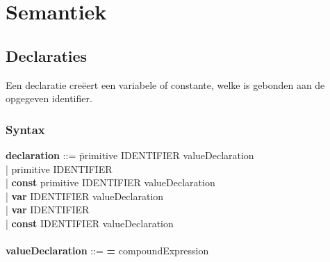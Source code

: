 \chapter{Semantiek}
\section{Declaraties}
Een declaratie cre\"{e}ert een variabele of constante, welke is gebonden aan de opgegeven identifier.
    \subsection{Syntax}    
        \begin{tabbing}
            {\bf declaration}         ::= \=primitive IDENTIFIER valueDeclaration\\
                                      \>| primitive IDENTIFIER\\
                                      \>| \textbf{const} primitive IDENTIFIER valueDeclaration\\
                                      \>| \textbf{var} IDENTIFIER valueDeclaration\\
                                      \>| \textbf{var} IDENTIFIER\\
                                      \>| \textbf{const} IDENTIFIER valueDeclaration\\
            \\
            {\bf valueDeclaration}    ::= \textbf{=} compoundExpression\\
        \end{tabbing}
